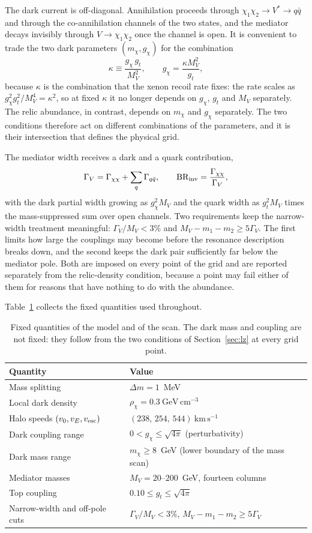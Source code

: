 The dark current is off-diagonal. Annihilation proceeds through $\chi_1\chi_2\to V^*\to q\bar q$ and through the co-annihilation channels of the two states, and the mediator decays invisibly through $V\to\chi_1\chi_2$ once the channel is open. It is convenient to trade the two dark parameters $(m_\chi,g_\chi)$ for the combination
\begin{equation}
\kappa\equiv\frac{g_\chi\,g_t}{M_V^2},
\qquad
g_\chi=\frac{\kappa M_V^2}{g_t},
\label{eq:kappa}
\end{equation}
because $\kappa$ is the combination that the xenon recoil rate fixes: the rate scales as $g_\chi^2g_t^2/M_V^4=\kappa^2$, so at fixed $\kappa$ it no longer depends on $g_\chi$, $g_t$ and $M_V$ separately. The relic abundance, in contrast, depends on $m_\chi$ and $g_\chi$ separately. The two conditions therefore act on different combinations of the parameters, and it is their intersection that defines the physical grid.

The mediator width receives a dark and a quark contribution,
\begin{equation}
\Gamma_V=\Gamma_{\chi\chi}+\sum_q\Gamma_{q\bar q},
\qquad
\mathrm{BR}_{\rm inv}=\frac{\Gamma_{\chi\chi}}{\Gamma_V},
\label{eq:width}
\end{equation}
with the dark partial width growing as $g_\chi^2M_V$ and the quark width as $g_t^2M_V$ times the mass-suppressed sum over open channels. Two requirements keep the narrow-width treatment meaningful: $\Gamma_V/M_V<3\%$ and $M_V-m_1-m_2\ge5\Gamma_V$. The first limits how large the couplings may become before the resonance description breaks down, and the second keeps the dark pair sufficiently far below the mediator pole. Both are imposed on every point of the grid and are reported separately from the relic-density condition, because a point may fail either of them for reasons that have nothing to do with the abundance.

Table~\ref{tab:bench} collects the fixed quantities used throughout.
\begin{table}[htbp]
\centering
\caption{Fixed quantities of the model and of the scan. The dark mass and coupling are not fixed: they follow from the two conditions of Section~\ref{sec:lz} at every grid point.}
\label{tab:bench}
\begin{tabular}{ll}
\toprule
Quantity & Value \\
\midrule
Mass splitting & $\Delta m=1$~MeV \\
Local dark density & $\rho_\chi=0.3\ \mathrm{GeV\,cm^{-3}}$ \\
Halo speeds $(v_0,v_E,v_{\rm esc})$ & $(238,\,254,\,544)\ \mathrm{km\,s^{-1}}$ \\
Dark coupling range & $0<g_\chi\le\sqrt{4\pi}$ (perturbativity) \\
Dark mass range & $m_\chi\ge8$~GeV (lower boundary of the mass scan) \\
Mediator masses & $M_V=20$--$200$~GeV, fourteen columns \\
Top coupling & $0.10\le g_t\le\sqrt{4\pi}$ \\
Narrow-width and off-pole cuts & $\Gamma_V/M_V<3\%$, $M_V-m_1-m_2\ge5\Gamma_V$ \\
\bottomrule
\end{tabular}
\end{table}
